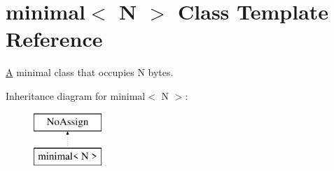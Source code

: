 \hypertarget{classminimal}{}\section{minimal$<$ N $>$ Class Template Reference}
\label{classminimal}


\hyperlink{structA}{A} minimal class that occupies N bytes.  


Inheritance diagram for minimal$<$ N $>$\+:\begin{figure}[H]
\begin{center}
\leavevmode
\includegraphics[height=2.000000cm]{classminimal}
\end{center}
\end{figure}
